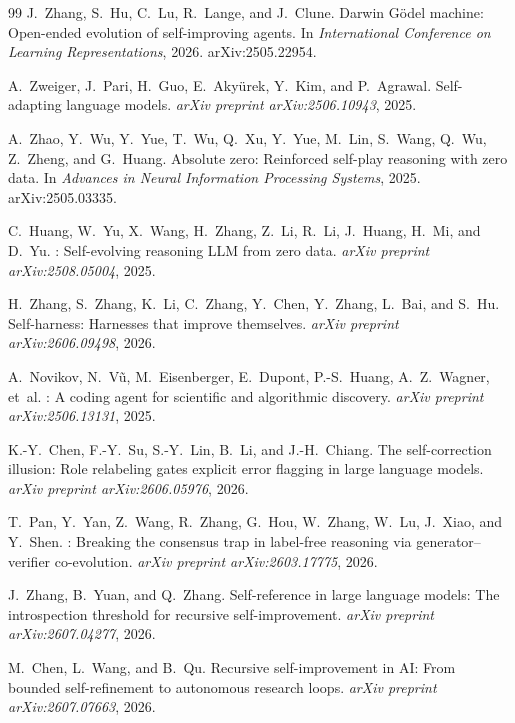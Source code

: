 \documentclass[11pt,a4paper]{article}
\begin{document}
\begin{thebibliography}{99}
J.~Zhang, S.~Hu, C.~Lu, R.~Lange, and J.~Clune.
\newblock Darwin {G}\"{o}del machine: Open-ended evolution of self-improving agents.
\newblock In \emph{International Conference on Learning Representations}, 2026.
\newblock arXiv:2505.22954.

A.~Zweiger, J.~Pari, H.~Guo, E.~Aky\"{u}rek, Y.~Kim, and P.~Agrawal.
\newblock Self-adapting language models.
\newblock \emph{arXiv preprint arXiv:2506.10943}, 2025.

A.~Zhao, Y.~Wu, Y.~Yue, T.~Wu, Q.~Xu, Y.~Yue, M.~Lin, S.~Wang, Q.~Wu, Z.~Zheng, and G.~Huang.
\newblock Absolute zero: Reinforced self-play reasoning with zero data.
\newblock In \emph{Advances in Neural Information Processing Systems}, 2025.
\newblock arXiv:2505.03335.

C.~Huang, W.~Yu, X.~Wang, H.~Zhang, Z.~Li, R.~Li, J.~Huang, H.~Mi, and D.~Yu.
: Self-evolving reasoning {LLM} from zero data.
\newblock \emph{arXiv preprint arXiv:2508.05004}, 2025.

H.~Zhang, S.~Zhang, K.~Li, C.~Zhang, Y.~Chen, Y.~Zhang, L.~Bai, and S.~Hu.
\newblock Self-harness: Harnesses that improve themselves.
\newblock \emph{arXiv preprint arXiv:2606.09498}, 2026.

A.~Novikov, N.~V\~{u}, M.~Eisenberger, E.~Dupont, P.-S.~Huang, A.~Z.~Wagner, et~al.
: A coding agent for scientific and algorithmic discovery.
\newblock \emph{arXiv preprint arXiv:2506.13131}, 2025.

K.-Y.~Chen, F.-Y.~Su, S.-Y.~Lin, B.~Li, and J.-H.~Chiang.
\newblock The self-correction illusion: Role relabeling gates explicit error flagging in large language models.
\newblock \emph{arXiv preprint arXiv:2606.05976}, 2026.

T.~Pan, Y.~Yan, Z.~Wang, R.~Zhang, G.~Hou, W.~Zhang, W.~Lu, J.~Xiao, and Y.~Shen.
: Breaking the consensus trap in label-free reasoning via generator--verifier co-evolution.
\newblock \emph{arXiv preprint arXiv:2603.17775}, 2026.

J.~Zhang, B.~Yuan, and Q.~Zhang.
\newblock Self-reference in large language models: The introspection threshold for recursive self-improvement.
\newblock \emph{arXiv preprint arXiv:2607.04277}, 2026.

M.~Chen, L.~Wang, and B.~Qu.
\newblock Recursive self-improvement in {AI}: From bounded self-refinement to autonomous research loops.
\newblock \emph{arXiv preprint arXiv:2607.07663}, 2026.


\end{thebibliography}
\end{document}
